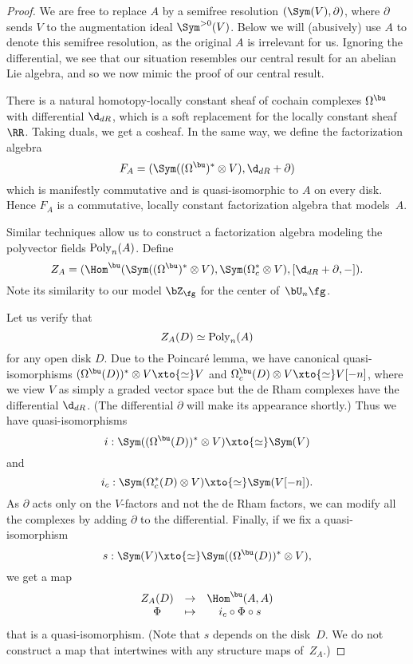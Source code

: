 \begin{proof}
We are free to replace $A$ by a semifree resolution $(\Sym(V), \partial)$,
where $\partial$ sends $V$ to the augmentation ideal $\Sym^{> 0}(V)$.
Below we will (abusively) use $A$ to denote this semifree resolution,
as the original $A$ is irrelevant for us.
Ignoring the differential, we see that our situation resembles our central result for an abelian Lie algebra,
and so we now mimic the proof of our central result.

There is a natural homotopy-locally constant sheaf of cochain complexes $\Omega^\bu$ with differential $\d_{dR}$,
which is a soft replacement for the locally constant sheaf $\RR$.
Taking duals, we get a cosheaf.
In the same way, we define the factorization algebra 
\[
F_A = (\Sym((\Omega^\bu)^* \otimes V ), \d_{dR} + \partial) 
\]
which is manifestly commutative and is quasi-isomorphic to $A$ on every disk.
Hence $F_A$ is a commutative, locally constant factorization algebra that models~$A$.

Similar techniques allow us to construct a factorization algebra modeling the polyvector fields ${\rm Poly}_n(A)$.
Define
\[
Z_A = (\Hom^\bu(\Sym((\Omega^\bu)^* \otimes V), \Sym(\Omega_c^* \otimes V), [\d_{dR} + \partial,-]).
\]
Note its similarity to our model $\bZ_\fg$ for the center of~$\bU_n \fg$.

Let us verify that 
\[
Z_A(D) \simeq {\rm Poly}_n(A)
\]
for any open disk $D$.
Due to the Poincar\'e lemma, we have canonical quasi-isomorphisms $(\Omega^\bu(D))^* \otimes V \xto{\simeq} V$ and $\Omega^\bu_c(D) \otimes V \xto{\simeq} V[-n]$,
where we view $V$ as simply a graded vector space but the de Rham complexes have the differential $\d_{dR}$.
(The differential $\partial$ will make its appearance shortly.)
Thus we have quasi-isomorphisms
\[
i: \Sym((\Omega^\bu(D))^* \otimes V) \xto{\simeq} \Sym(V)
\]
and 
\[
i_c: \Sym(\Omega_c^*(D) \otimes V) \xto{\simeq} \Sym(V[-n]).
\]
As $\partial$ acts only on the $V$-factors and not the de Rham factors,
we can modify all the complexes by adding $\partial$ to the differential.
Finally, if we fix a quasi-isomorphism 
\[
s: \Sym(V) \xto{\simeq} \Sym((\Omega^\bu(D))^* \otimes V),
\]
we get a map
\[
\begin{array}{ccc}
Z_A(D) & \to & \Hom^\bu(A,A)\\
\Phi & \mapsto & i_c \circ \Phi \circ s
\end{array}
\]
that is a quasi-isomorphism.
(Note that $s$ depends on the disk~$D$. 
We do not construct a map that intertwines with any structure maps of~$Z_A$.)


\end{proof}
